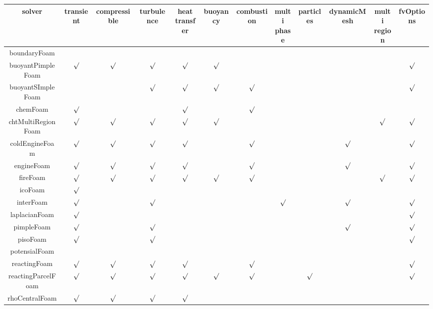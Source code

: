 \documentclass{article}
\begin{document}
\begin{landscape}
\begin{table}[h!]
    \centering
\begin{tabular}{cccccccccccc}

\hline
solver & transient & compressible  & turbulence & \makecell{heat\\transfer} & buoyancy & combustion & \makecell{multi\\phase} & particles& dynamicMesh & \makecell{multi\\region} & fvOptions\\  
\hline
boundaryFoam \\
\hline
buoyantPimpleFoam & $\surd$ & $\surd$ & $\surd$ & $\surd$ & $\surd$ & & & & & & $\surd$  \\
\hline
buoyantSImpleFoam & & & $\surd$ & $\surd$ & $\surd$ & $\surd$ & & & & & $\surd$ \\
\hline
chemFoam & $\surd$ & & & $\surd$ & & $\surd$ & & & & & \\
\hline
chtMultiRegionFoam & $\surd$ & $\surd$ & $\surd$ & $\surd$ & $\surd$ & & & & & $\surd$ & $\surd$ \\
\hline
coldEngineFoam & $\surd$ & $\surd$ & $\surd$ & $\surd$ & & $\surd$ & & & $\surd$ & & $\surd$ \\
\hline
engineFoam & $\surd$ & $\surd$ & $\surd$ & $\surd$ & & $\surd$ & & & $\surd$ & & $\surd$ \\
\hline
fireFoam & $\surd$ & $\surd$ & $\surd$ & $\surd$ & $\surd$ & $\surd$ & & & & $\surd$ & $\surd$ \\
\hline
icoFoam & $\surd$ & & & & & & & & & & \\
\hline
interFoam & $\surd$ & & $\surd$ & & & & $\surd$ & & $\surd$ & & $\surd$ \\
\hline
laplacianFoam & $\surd$ & & & & & & & & & & $\surd$ \\
\hline
pimpleFoam & $\surd$ & & $\surd$ & & & & & & $\surd$ & & $\surd$ \\
\hline
pisoFoam & $\surd$ & & $\surd$ & & & & & & & & $\surd$ \\
\hline
potensialFoam \\
\hline
reactingFoam & $\surd$ & $\surd$ & $\surd$ & $\surd$ & & $\surd$ & & & & & $\surd$ \\
\hline
reactingParcelFoam & $\surd$ & $\surd$ & $\surd$ & $\surd$ & $\surd$ & $\surd$ & & $\surd$ & & & $\surd$ \\
\hline
rhoCentralFoam & $\surd$ & $\surd$ & $\surd$ & $\surd$ & & & & & &  & \\

\end{tabular}
\end{table}
\end{landscape}
\end{document}
